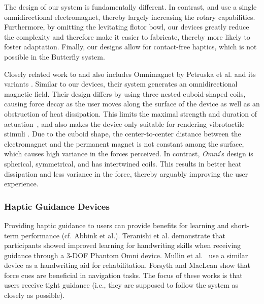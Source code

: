 The design of our system is fundamentally different. In contrast, \omniHap and \omniUIST use a single omnidirectional electromagnet, thereby largely increasing the rotary capabilities. Furthermore, by omitting the levitating flotor bowl, our devices greatly reduce the complexity and therefore make it easier to fabricate, thereby more likely to foster adaptation. Finally, our designs allow for contact-free haptics, which is not possible in the Butterfly system.

Closely related work to \omniHap and \omniUIST also includes Omnimagnet by Petruska et al. \cite{petruska2014omnimagnet} and its variants \cite{iqbal2019design}. Similar to our devices, their system generates an omnidirectional magnetic field. Their design differs by using three nested cuboid-shaped coils, causing force decay as the user moves along the surface of the device as well as an obstruction of heat dissipation. This limits the maximal strength and duration of actuation~\cite{esmailie2017thermal}, and also makes the device only suitable for rendering vibrotactile stimuli \cite{zhang2018six}. Due to the cuboid shape, the center-to-center distance between the electromagnet and the permanent magnet is not constant among the surface, which causes high variance in the forces perceived. In contrast, \textit{Omni}'s design is spherical, symmetrical, and has intertwined coils. This results in better heat dissipation and less variance in the force, thereby arguably improving the user experience.

\subsubsection{Haptic Guidance Devices}
Providing haptic guidance to users can provide benefits for learning \cite{teranishi2018combining} and short-term performance (cf. Abbink et al.\cite{Abbink2012}). Teranishi et al.\cite{teranishi2018combining} demonstrate that participants showed improved learning for handwriting skills when receiving guidance through a 3-DOF Phantom Omni device. Mullin et al.~\cite{mullins2005haptic} use a similar device as a handwriting aid for rehabilitation. Forsyth and MacLean \cite{Forsyth2006} show that force cues are beneficial in navigation tasks. The focus of these works is that users receive tight guidance (i.e., they are supposed to follow the system as closely as possible).

